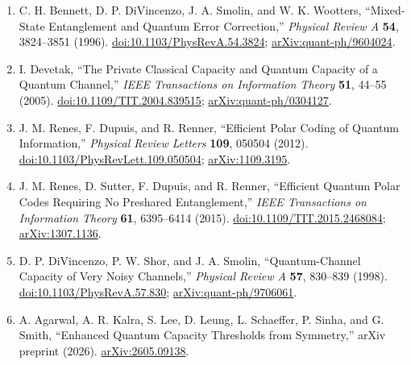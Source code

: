 \begin{enumerate}[label={},leftmargin=4.8em,labelsep=0.5em]
  \scriptsize
  \item[\textup{[BDSW96]}]\label{ref:p1-bennett}
  C. H. Bennett, D. P. DiVincenzo, J. A. Smolin, and W. K. Wootters,
  ``Mixed-State Entanglement and Quantum Error Correction,''
  \emph{Physical Review A} \textbf{54}, 3824--3851 (1996).
  \href{https://doi.org/10.1103/PhysRevA.54.3824}{doi:10.1103/PhysRevA.54.3824};
  \href{https://arxiv.org/abs/quant-ph/9604024}{arXiv:quant-ph/9604024}.

  \item[\textup{[Dev05]}]\label{ref:p1-devetak}
  I. Devetak, ``The Private Classical Capacity and Quantum Capacity of a
  Quantum Channel,'' \emph{IEEE Transactions on Information Theory}
  \textbf{51}, 44--55 (2005).
  \href{https://doi.org/10.1109/TIT.2004.839515}{doi:10.1109/TIT.2004.839515};
  \href{https://arxiv.org/abs/quant-ph/0304127}{arXiv:quant-ph/0304127}.

  \item[\textup{[RDR12]}]\label{ref:p1-renes-2012}
  J. M. Renes, F. Dupuis, and R. Renner,
  ``Efficient Polar Coding of Quantum Information,''
  \emph{Physical Review Letters} \textbf{109}, 050504 (2012).
  \newline
  \href{https://doi.org/10.1103/PhysRevLett.109.050504}{doi:10.1103/PhysRevLett.109.050504};
  \href{https://arxiv.org/abs/1109.3195}{arXiv:1109.3195}.

  \item[\textup{[RSDR15]}]\label{ref:p1-renes-2015}
  J. M. Renes, D. Sutter, F. Dupuis, and R. Renner, ``Efficient Quantum Polar
  Codes Requiring No Preshared Entanglement,'' \emph{IEEE Transactions on
  Information Theory} \textbf{61}, 6395--6414 (2015).
  \href{https://doi.org/10.1109/TIT.2015.2468084}{doi:10.1109/TIT.2015.2468084};
  \href{https://arxiv.org/abs/1307.1136}{arXiv:1307.1136}.

  \item[\textup{[DSS98]}]\label{ref:p1-divincenzo}
  D. P. DiVincenzo, P. W. Shor, and J. A. Smolin, ``Quantum-Channel Capacity
  of Very Noisy Channels,'' \emph{Physical Review A} \textbf{57}, 830--839
  (1998). \href{https://doi.org/10.1103/PhysRevA.57.830}{doi:10.1103/PhysRevA.57.830};
  \href{https://arxiv.org/abs/quant-ph/9706061}{arXiv:quant-ph/9706061}.

  \item[\textup{[AKL+26]}]\label{ref:p1-agarwal-et-al}
  A. Agarwal, A. R. Kalra, S. Lee, D. Leung, L. Schaeffer, P. Sinha, and
  G. Smith, ``Enhanced Quantum Capacity Thresholds from Symmetry,'' arXiv
  preprint (2026).
  \href{https://arxiv.org/abs/2605.09138}{arXiv:2605.09138}.


\end{enumerate}
